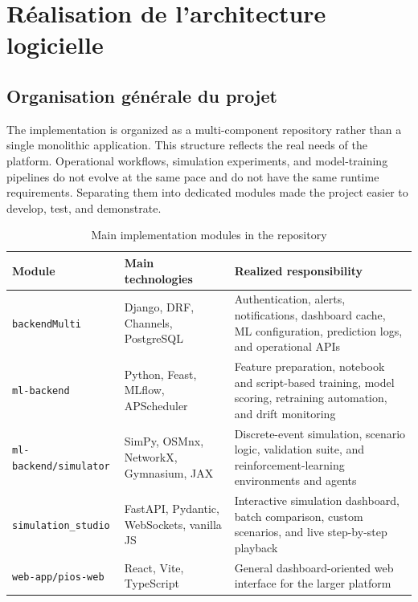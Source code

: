 \section{Réalisation de l'architecture logicielle}
\label{sec:realization-architecture}

\subsection{Organisation générale du projet}
\label{sec:project-organization}

The implementation is organized as a multi-component repository rather than a single monolithic application. This structure reflects the real needs of the platform. Operational workflows, simulation experiments, and model-training pipelines do not evolve at the same pace and do not have the same runtime requirements. Separating them into dedicated modules made the project easier to develop, test, and demonstrate.

\begin{table}[htbp]
\centering
\caption{Main implementation modules in the repository}
\label{tab:repository-modules}
\small
\begin{tabular}{@{}lp{3.1cm}p{6.0cm}@{}}
\toprule
\textbf{Module} & \textbf{Main technologies} & \textbf{Realized responsibility} \\
\midrule
\texttt{backendMulti} & Django, DRF, Channels, PostgreSQL & Authentication, alerts, notifications, dashboard cache, ML configuration, prediction logs, and operational APIs \\
\texttt{ml-backend} & Python, Feast, MLflow, APScheduler & Feature preparation, notebook and script-based training, model scoring, retraining automation, and drift monitoring \\
\texttt{ml-backend/simulator} & SimPy, OSMnx, NetworkX, Gymnasium, JAX & Discrete-event simulation, scenario logic, validation suite, and reinforcement-learning environments and agents \\
\texttt{simulation\_studio} & FastAPI, Pydantic, WebSockets, vanilla JS & Interactive simulation dashboard, batch comparison, custom scenarios, and live step-by-step playback \\
\texttt{web-app/pios-web} & React, Vite, TypeScript & General dashboard-oriented web interface for the larger platform \\
\bottomrule
\end{tabular}
\end{table}

